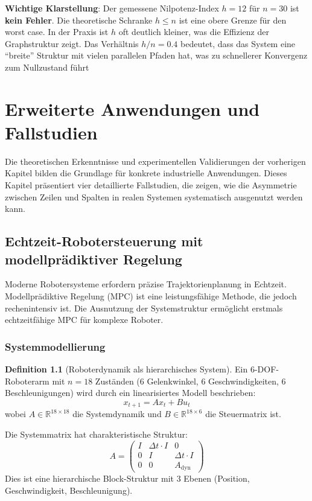 ﻿\documentclass[a4paper,12pt]{report}
\theoremstyle{definition}
\newtheorem{definition}{Definition}
\begin{document}
	\textbf{Wichtige Klarstellung}: Der gemessene Nilpotenz-Index $h = 12$ für $n = 30$ ist \textbf{kein Fehler}. Die theoretische Schranke $h \leq n$ ist eine obere Grenze für den worst case. In der Praxis ist $h$ oft deutlich kleiner, was die Effizienz der Graphstruktur zeigt. Das Verhältnis $h/n = 0.4$ bedeutet, dass das System eine ``breite'' Struktur mit vielen parallelen Pfaden hat, was zu schnellerer Konvergenz zum Nullzustand führt
	
	\chapter{Erweiterte Anwendungen und Fallstudien}
	
	Die theoretischen Erkenntnisse und experimentellen Validierungen der vorherigen Kapitel bilden die Grundlage für konkrete industrielle Anwendungen. Dieses Kapitel präsentiert vier detaillierte Fallstudien, die zeigen, wie die Asymmetrie zwischen Zeilen und Spalten in realen Systemen systematisch ausgenutzt werden kann.
	
	\section{Echtzeit-Robotersteuerung mit modellprädiktiver Regelung}
	
	Moderne Robotersysteme erfordern präzise Trajektorienplanung in Echtzeit. Modellprädiktive Regelung (MPC) ist eine leistungsfähige Methode, die jedoch rechenintensiv ist. Die Ausnutzung der Systemstruktur ermöglicht erstmals echtzeitfähige MPC für komplexe Roboter.
	
	\subsection{Systemmodellierung}
	
	\begin{definition}[Roboterdynamik als hierarchisches System]
		Ein 6-DOF-Roboterarm mit $n = 18$ Zuständen (6 Gelenkwinkel, 6 Geschwindigkeiten, 6 Beschleunigungen) wird durch ein linearisiertes Modell beschrieben:
		\[
		x_{t+1} = A x_t + B u_t
		\]
		wobei $A \in \mathbb{R}^{18 \times 18}$ die Systemdynamik und $B \in \mathbb{R}^{18 \times 6}$ die Steuermatrix ist.
		
		Die Systemmatrix hat charakteristische Struktur:
		\[
		A = \begin{pmatrix}
			I & \Delta t \cdot I & 0 \\
			0 & I & \Delta t \cdot I \\
			0 & 0 & A_{\text{dyn}}
		\end{pmatrix}
		\]
		Dies ist eine hierarchische Block-Struktur mit 3 Ebenen (Position, Geschwindigkeit, Beschleunigung).
	\end{definition}
	
\end{document}
